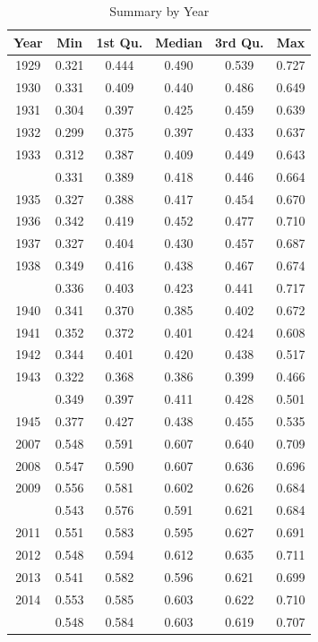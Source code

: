 \documentclass[11pt,a4paper,]{article}
\begin{document}
\begin{longtable}[t]{cccccc}
\caption{\label{tab:unnamed-chunk-6}Summary by Year}\\
\toprule
Year & Min & 1st Qu. & Median & 3rd Qu. & Max\\
\midrule
1929 & 0.321 & 0.444 & 0.490 & 0.539 & 0.727\\
1930 & 0.331 & 0.409 & 0.440 & 0.486 & 0.649\\
1931 & 0.304 & 0.397 & 0.425 & 0.459 & 0.639\\
1932 & 0.299 & 0.375 & 0.397 & 0.433 & 0.637\\
1933 & 0.312 & 0.387 & 0.409 & 0.449 & 0.643\\
\addlinespace
1934 & 0.331 & 0.389 & 0.418 & 0.446 & 0.664\\
1935 & 0.327 & 0.388 & 0.417 & 0.454 & 0.670\\
1936 & 0.342 & 0.419 & 0.452 & 0.477 & 0.710\\
1937 & 0.327 & 0.404 & 0.430 & 0.457 & 0.687\\
1938 & 0.349 & 0.416 & 0.438 & 0.467 & 0.674\\
\addlinespace
1939 & 0.336 & 0.403 & 0.423 & 0.441 & 0.717\\
1940 & 0.341 & 0.370 & 0.385 & 0.402 & 0.672\\
1941 & 0.352 & 0.372 & 0.401 & 0.424 & 0.608\\
1942 & 0.344 & 0.401 & 0.420 & 0.438 & 0.517\\
1943 & 0.322 & 0.368 & 0.386 & 0.399 & 0.466\\
\addlinespace
1944 & 0.349 & 0.397 & 0.411 & 0.428 & 0.501\\
1945 & 0.377 & 0.427 & 0.438 & 0.455 & 0.535\\
2007 & 0.548 & 0.591 & 0.607 & 0.640 & 0.709\\
2008 & 0.547 & 0.590 & 0.607 & 0.636 & 0.696\\
2009 & 0.556 & 0.581 & 0.602 & 0.626 & 0.684\\
\addlinespace
2010 & 0.543 & 0.576 & 0.591 & 0.621 & 0.684\\
2011 & 0.551 & 0.583 & 0.595 & 0.627 & 0.691\\
2012 & 0.548 & 0.594 & 0.612 & 0.635 & 0.711\\
2013 & 0.541 & 0.582 & 0.596 & 0.621 & 0.699\\
2014 & 0.553 & 0.585 & 0.603 & 0.622 & 0.710\\
\addlinespace
2015 & 0.548 & 0.584 & 0.603 & 0.619 & 0.707\\
\bottomrule
\end{longtable}
\endgroup{}
\end{document}
